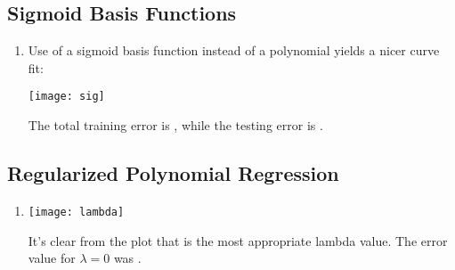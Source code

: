 \documentclass{article}
\begin{document}
\subsection{Sigmoid Basis Functions}

\begin{enumerate}
\item Use of a sigmoid basis function instead of a polynomial yields
  a nicer curve fit:
  \begin{center}
  \texttt{[image: sig]}
\end{center}
  The total training error is , while the testing error is
  .
\end{enumerate}

\subsection{Regularized Polynomial Regression}

\begin{enumerate}
\item
  \begin{center}
  \texttt{[image: lambda]}
\end{center}
  It's clear from the plot that  is the most appropriate lambda
  value. The error value for $\lambda = 0$ was .
\end{enumerate}
\end{document}
